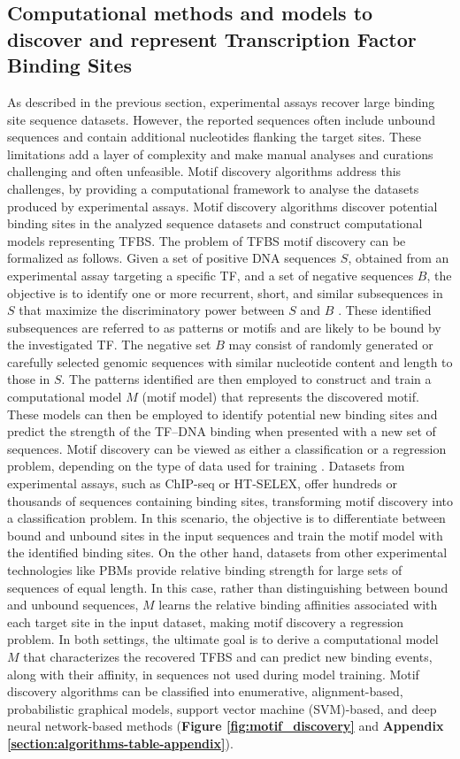 \documentclass[a4paper, titlepage, openright]{book}
\begin{document}
\subsection{Computational methods and models to discover and represent Transcription Factor Binding Sites}
As described in the previous section, experimental assays recover large binding site sequence datasets. However, the reported sequences often include unbound sequences and contain additional nucleotides flanking the target sites. These limitations add a layer of complexity and make manual analyses and curations challenging and often unfeasible. Motif discovery algorithms address this challenges, by providing a computational framework to analyse the datasets produced by experimental assays. Motif discovery algorithms discover potential binding sites in the analyzed sequence datasets and construct computational models representing TFBS. The problem of TFBS motif discovery can be formalized as follows. Given a set of positive DNA sequences $S$, obtained from an experimental assay targeting a specific TF, and a set of negative sequences $B$, the objective is to identify one or more recurrent, short, and similar subsequences in $S$ that maximize the discriminatory power between $S$ and $B$ \citep{tognon2023survey}. These identified subsequences are referred to as patterns or motifs and are likely to be bound by the investigated TF. The negative set $B$ may consist of randomly generated or carefully selected genomic sequences with similar nucleotide content and length to those in $S$. The patterns identified are then employed to construct and train a computational model $M$ (motif model) that represents the discovered motif. These models can then be employed to identify potential new binding sites and predict the strength of the TF–DNA binding when presented with a new set of sequences. Motif discovery can be viewed as either a classification or a regression problem, depending on the type of data used for training \citep{tognon2023survey}. Datasets from experimental assays, such as ChIP-seq or HT-SELEX, offer hundreds or thousands of sequences containing binding sites, transforming motif discovery into a classification problem. In this scenario, the objective is to differentiate between bound and unbound sites in the input sequences and train the motif model with the identified binding sites. On the other hand, datasets from other experimental technologies like PBMs provide relative binding strength for large sets of sequences of equal length. In this case, rather than distinguishing between bound and unbound sequences, $M$ learns the relative binding affinities associated with each target site in the input dataset, making motif discovery a regression problem. In both settings, the ultimate goal is to derive a computational model $M$ that characterizes the recovered TFBS and can predict new binding events, along with their affinity, in sequences not used during model training. Motif discovery algorithms can be classified into enumerative, alignment-based, probabilistic graphical models, support vector machine (SVM)-based, and deep neural network-based methods (\textbf{Figure \ref{fig:motif_discovery}} and \textbf{Appendix \ref{section:algorithms-table-appendix}}). 
\end{document}
